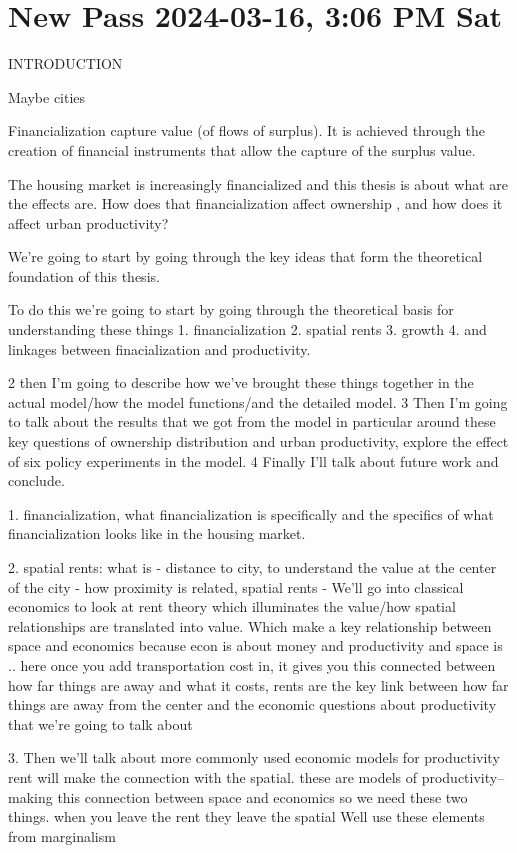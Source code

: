 \section{New Pass 2024-03-16, 3:06 PM Sat}

INTRODUCTION

Maybe cities

Financialization capture value (of flows of surplus). It is achieved through the creation of financial instruments that allow the capture of the surplus value. 

The housing market is increasingly financialized and this thesis is about what are the effects are. How does that financialization affect ownership , and how does it affect urban productivity?

We’re going to start by going through the key ideas that form the theoretical foundation of this thesis.


To do this we’re going to start by going through the theoretical basis for understanding these things
1. financialization
2. spatial rents
3. growth
4. and linkages between finacialization and productivity.
 
 2 then I'm going to describe how we've brought these things together in the actual model/how the model functions/and the detailed model.
 3 Then I'm going to talk about the results that we got from the model in particular around these key questions of ownership distribution and urban productivity, explore the effect of six policy experiments in the model. 
 4 Finally I'll talk about future work and conclude.



1. financialization, what financialization is  specifically  and  the specifics of what financialization looks like in the housing market.

2. spatial rents: what is - distance to city, to understand the value at the center of the city - how proximity is related, spatial rents - We'll go into classical economics to look at rent theory which illuminates the value/how spatial relationships are translated into value. Which make a key relationship between space and economics because econ is about money and productivity and space is .. here once you add transportation cost in, it gives you this connected between how far things are away and what it costs, rents are the key link between how far things are away from the center and the economic questions about productivity  that we're going to talk about

3. Then we'll talk about more commonly used economic models for productivity
rent will make the connection with the spatial. 
these are models of productivity-- making this connection between space and economics so we need these two things.
when you leave the rent they leave the spatial
Well use these elements from marginalism

